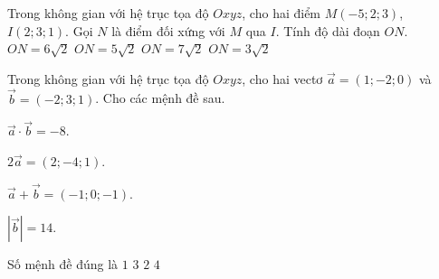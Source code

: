 \begin{ex}%
 Trong không gian với hệ trục tọa độ $Oxyz$, cho hai điểm $M(-5;2;3)$, $I(2;3;1)$. Gọi $N$ là điểm đối xứng với $M$ qua $I$. Tính độ dài đoạn $ON$.
 \choice
 {$ON=6\sqrt2$}
 {$ON=5\sqrt2$}
 {\True $ON=7\sqrt2$}
 {$ON=3\sqrt2$}
 \end{ex}

\begin{ex}%
 Trong không gian với hệ trục tọa độ $Oxyz$, cho hai vectơ $\overrightarrow a=(1;-2;0)$ và $\overrightarrow b=(-2;3;1)$. Cho các mệnh đề sau.
 \begin{enumEX}{2}
 \item $\overrightarrow a\cdot\overrightarrow b=-8$.
 \item $2\overrightarrow a=(2;-4;1)$.
 \item $\overrightarrow a+\overrightarrow b=(-1;0;-1)$.
 \item $\left|\overrightarrow b\right|=14$.
 \end{enumEX}
 Số mệnh đề đúng là
 \choice
 {\True $1$}
 {$3$}
 {$2$}
 {$4$}
 \end{ex}

